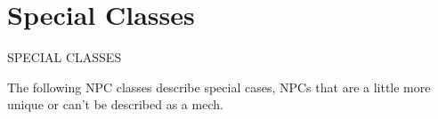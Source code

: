 \section{Special Classes}
      SPECIAL CLASSES  

The following NPC classes describe special cases, NPCs that are a little more unique or can’t be  
described as a mech.



































                                                         
